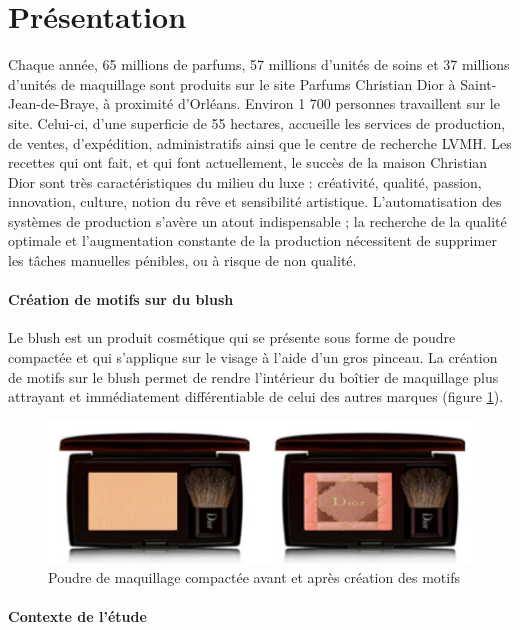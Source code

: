 

\section{Présentation}

Chaque année, 65 millions de parfums, 57 millions d’unités de soins et 37 millions d’unités de maquillage sont produits sur le site Parfums Christian Dior à Saint-Jean-de-Braye, à proximité d’Orléans. Environ 1 700 personnes travaillent sur le site. Celui-ci, d’une superficie de 55 hectares, accueille les services de production, de ventes, d’expédition, administratifs ainsi que le centre de recherche LVMH. Les recettes qui ont fait, et qui font actuellement, le succès de la maison Christian Dior sont très caractéristiques du milieu du luxe : créativité, qualité, passion, innovation, culture, notion du rêve et sensibilité artistique. L’automatisation des systèmes de production s’avère un atout indispensable ; la recherche de la qualité optimale et l’augmentation constante de la production nécessitent de supprimer les tâches manuelles pénibles, ou à risque de non qualité.

\paragraph{Création de motifs sur du blush}

Le blush est un produit cosmétique qui se présente sous forme de poudre compactée et qui s’applique sur le visage à l'aide d'un gros pinceau. La création de motifs sur le blush permet de rendre l'intérieur du boîtier de maquillage plus attrayant et immédiatement différentiable de celui des autres marques (figure \ref{img01}).

\begin{figure}[!h]
\centering\includegraphics[width=0.65\linewidth]{img/fig01}
 \caption{Poudre de maquillage compactée avant et après création des motifs}
 \label{img01}
\end{figure}

\paragraph{Contexte de l’étude}

